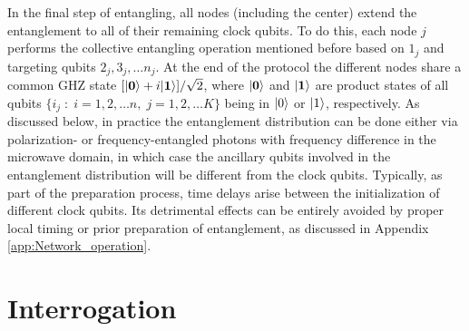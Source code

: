 In the final step of entangling, all nodes (including the center) extend the
entanglement to all of their remaining clock qubits. To do this, each node $j$
performs the collective entangling operation mentioned before based on
$1_j$ and targeting qubits $2_j, 3_j, \dots n_j$.  At the end of the protocol the different nodes share a common
GHZ state $[| \mathbf{0} \rangle + i| \mathbf{1} \rangle]/\sqrt{2}$, where
$| \mathbf{0} \rangle$ and $| \mathbf{1} \rangle$ are product states of all qubits
$\{i_j\;:\; i=1,2,\dots n,\; j=1,2,\dots K\}$ being in $| 0 \rangle$ or $| 1 \rangle$,
respectively. As discussed below, in practice the entanglement distribution can
be done  either via polarization- or frequency-entangled photons with frequency
difference in the microwave domain, in which case the ancillary qubits involved
in the entanglement distribution will be different from the clock qubits.
Typically, as part of the preparation process, time delays arise between the
initialization of different clock qubits. Its detrimental effects can be
entirely avoided by proper local timing or prior preparation of entanglement, as
discussed in Appendix \ref{app:Network_operation}.

\section{Interrogation}
\label{sec:SA}


